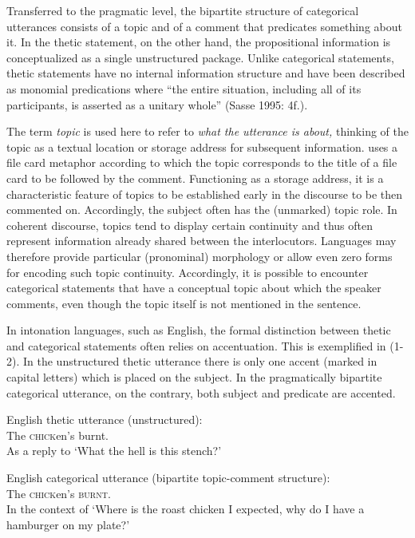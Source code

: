 \documentclass[output=paper]{langsci/langscibook}
\begin{document}
Transferred to the pragmatic level, the bipartite structure of categorical utterances consists of a topic and of a comment that predicates something about it. In the thetic statement, on the other hand, the propositional information is conceptualized as a single unstructured package. Unlike categorical statements, thetic statements have no internal information structure and have been described as monomial predications where “the entire situation, including all of its participants, is asserted as a unitary whole” (Sasse 1995: 4f.). 

  The term \textit{topic} is used here to refer to \textit{what the utterance is about,} thinking of the topic as a textual location or storage address for subsequent information. \citet{Reinhart1982} uses a file card metaphor according to which the topic corresponds to the title of a file card to be followed by the comment. Functioning as a storage address, it is a characteristic feature of topics to be established early in the discourse to be then commented on. Accordingly, the subject often has the (unmarked) topic role. In coherent discourse, topics tend to display certain continuity and thus often represent information already shared between the interlocutors. Languages may therefore provide particular (pronominal) morphology or allow even zero forms for encoding such topic continuity. Accordingly, it is possible to encounter categorical statements that have a conceptual topic about which the speaker comments, even though the topic itself is not mentioned in the sentence. 

  In intonation languages, such as English, the formal distinction between thetic and categorical statements often relies on accentuation. This is exemplified in (1-2). In the unstructured thetic utterance there is only one accent (marked in capital letters) which is placed on the subject. In the pragmatically bipartite categorical utterance, on the contrary, both subject and predicate are accented.

\ea
{ English thetic utterance (unstructured):}\\
  The \textsc{chick}en’s burnt. \\
  As a reply to ‘What the hell is this stench?’
\z

\ea
{ English categorical utterance (bipartite topic-comment structure):}\\
  The \textsc{chick}en’s \textsc{burnt}. \\
  In the context of ‘Where is the roast chicken I expected, why do I have a hamburger on my plate?’ \citep[529]{Sasse1987}
\z
\end{document}
